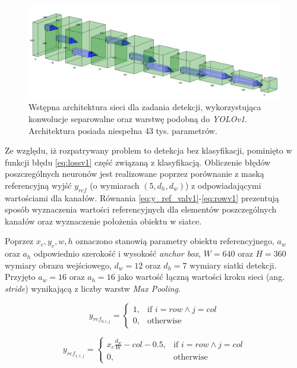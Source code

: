 \begin{figure}
    \centering
    \includegraphics[width=\linewidth]{images/arch_v1.png}
    \caption{Wstępna architektura sieci dla zadania detekcji, wykorzystująca konwolucje separowalne oraz warstwę podobną do \emph{YOLOv1}. Architektura posiada niespełna 43 tys. parametrów.}
    \label{fig:arch_v1}
\end{figure}

Ze względu, iż rozpatrywany problem to detekcja bez klasyfikacji, pominięto w funkcji błędu \eqref{eq:lossv1} część związaną z klasyfikacją. 
Obliczenie błędów poszczególnych neuronów jest realizowane poprzez porównanie z maską referencyjną wyjść $y_{ref}$ (o wymiarach $(5,d_h,d_w)$) z odpowiadającymi wartościami dla kanałów. 
Równania \eqref{eq:y_ref_valv1}-\eqref{eq:rowv1} prezentują sposób wyznaczenia wartości referencyjnych dla elementów poszczególnych kanałów oraz wyznaczenie położenia obiektu w siatce.

Poprzez $x_c, y_c, w, h$ oznaczono stanowią parametry obiektu referencyjnego, $a_w$ oraz $a_h$  odpowiednio szerokość i wysokość \emph{anchor box}, $W = 640$ oraz $H = 360$ wymiary obrazu wejściowego, $d_w = 12$ oraz $d_h = 7$ wymiary siatki detekcji. 
Przyjęto  $a_w = 16$ oraz $a_h = 16$ jako wartość łączną wartości kroku sieci (ang. \emph{stride}) wynikającą z liczby warstw \emph{Max Pooling}.

\begin{equation}
y_{ref}_{0,i,j} = 
\begin{cases}
    1, & \text{if }  i = row \land j = col \\
    0,              & \text{otherwise}
\end{cases}
\label{eq:y_ref_valv1}
\end{equation}

\begin{equation}
y_{ref}_{1,i,j} = 
\begin{cases}
    x_c \frac{d_w}{W} - col - 0.5, & \text{if }  i = row \land j = col \\
    0,              & \text{otherwise}
\end{cases}
\label{eq:y_ref_xv1}
\end{equation}

